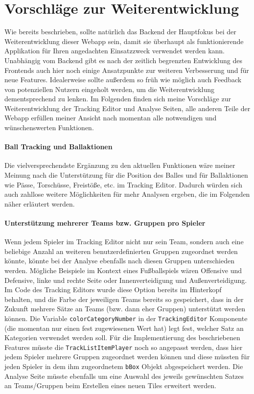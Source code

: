 \chapter{Vorschläge zur Weiterentwicklung} \label{chapter:vorschlaege-weiterentwicklung}

Wie bereits beschrieben, sollte natürlich das Backend der Hauptfokus bei der Weiterentwicklung dieser Webapp sein, damit sie überhaupt als funktionierende Applikation für Ihren angedachten Einsatzzweck verwendet werden kann. Unabhängig vom Backend gibt es nach der zeitlich begrenzten Entwicklung des Frontends auch hier noch einige Ansatzpunkte zur weiteren Verbesserung und für neue Features. Idealerweise sollte außerdem so früh wie möglich auch Feedback von potenziellen Nutzern eingeholt werden, um die Weiterentwicklung dementsprechend zu lenken. Im Folgenden finden sich meine Vorschläge zur Weiterentwicklung der Tracking Editor und Analyse Seiten, alle anderen Teile der Webapp erfüllen meiner Ansicht nach momentan alle notwendigen und wünschenswerten Funktionen.


\subsubsection{Ball Tracking und Ballaktionen}
Die vielversprechendste Ergänzung zu den aktuellen Funktionen wäre meiner Meinung nach die Unterstützung für die Position des Balles und für Ballaktionen wie Pässe, Torschüsse, Freistöße, etc. im Tracking Editor. Dadurch würden sich auch zahllose weitere Möglichkeiten für mehr Analysen ergeben, die im Folgenden näher erläutert werden.

\subsubsection{Unterstützung mehrerer Teams bzw. Gruppen pro Spieler}
Wenn jedem Spieler im Tracking Editor nicht nur sein Team, sondern auch eine beliebige Anzahl an weiteren benutzerdefinierten Gruppen zugeordnet werden könnte, könnte bei der Analyse ebenfalls nach diesen Gruppen unterschieden werden. Mögliche Beispiele im Kontext eines Fußballspiels wären Offensive und Defensive, linke und rechte Seite oder Innenverteidigung und Außenverteidigung. Im Code des Tracking Editors wurde diese Option bereits im Hinterkopf behalten, und die Farbe der jeweiligen Teams bereits so gespeichert, dass in der Zukunft mehrere Sätze an Teams (bzw. dann eher Gruppen) unterstützt werden können. Die Variable \texttt{colorCategoryNumber} in der \texttt{TrackingEditor} Komponente (die momentan nur einen fest zugewiesenen Wert hat) legt fest, welcher Satz an Kategorien verwendet werden soll. Für die Implementierung des beschriebenen Features müsste die \texttt{TrackListItemPlayer} noch so angepasst werden, dass hier jedem Spieler mehrere Gruppen zugeordnet werden können und diese müssten für jeden Spieler in dem ihm zugeordnetem \texttt{bBox} Objekt abgespeichert werden. Die Analyse Seite müsste ebenfalls um eine Auswahl des jeweils gewünschten Satzes an Teams/Gruppen beim Erstellen eines neuen Tiles erweitert werden.

